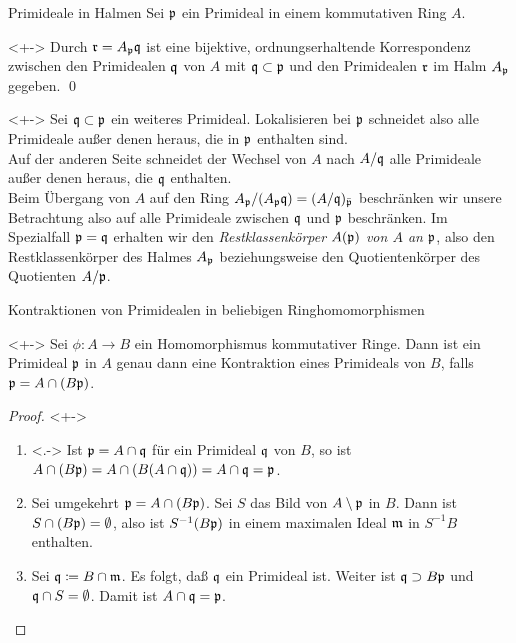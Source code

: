 \begin{frame}{Primideale in Halmen}
	Sei \(\mathfrak{p}\) ein Primideal in einem kommutativen Ring \(A\).
	\begin{corollary}<+->
		Durch \(\mathfrak{r} = A_{\mathfrak{p}} \mathfrak{q}\) ist eine bijektive, ordnungserhaltende Korrespondenz zwischen den
		Primidealen \(\mathfrak{q}\) von \(A\) mit \(\mathfrak{q} \subset \mathfrak{p}\) und den Primidealen \(\mathfrak{r}\) im Halm \(A_{\mathfrak{p}}\)
		gegeben.
		\qed
	\end{corollary}
	\begin{remark}<+->
		Sei \(\mathfrak{q} \subset \mathfrak{p}\) ein weiteres Primideal.
		Lokalisieren bei \(\mathfrak{p}\) schneidet also alle Primideale außer denen heraus, die in \(\mathfrak{p}\) enthalten sind.
		\\
		Auf der anderen Seite schneidet der Wechsel von \(A\) nach \(A/\mathfrak{q}\) alle Primideale außer denen heraus, die
		\(\mathfrak{q}\) enthalten.
		\\
		Beim Übergang von \(A\) auf den Ring \(A_{\mathfrak{p}}/(A_{\mathfrak{p}} \mathfrak{q}) = (A/\mathfrak{q})_{\bar{\mathfrak{p}}}\)
		beschränken wir unsere Betrachtung also auf alle Primideale zwischen \(\mathfrak{q}\) und \(\mathfrak{p}\) beschränken.
		Im Spezialfall \(\mathfrak{p} = \mathfrak{q}\) erhalten wir den \emph{Restklassenkörper \(A(\mathfrak{p})\) von \(A\) an \(\mathfrak{p}\)},
		also den Restklassenkörper des Halmes \(A_{\mathfrak{p}}\) beziehungsweise den Quotientenkörper des Quotienten \(A/\mathfrak{p}\).
	\end{remark}
\end{frame}

\begin{frame}{Kontraktionen von Primidealen in beliebigen Ringhomomorphismen}
	\begin{proposition}<+->
		Sei \(\phi\colon A \to B\) ein Homomorphismus kommutativer Ringe. Dann ist ein Primideal \(\mathfrak{p}\) in
		\(A\) genau dann eine Kontraktion eines Primideals von \(B\), falls \(\mathfrak{p} = A \cap (B\mathfrak{p})\).
	\end{proposition}
	\begin{proof}<+->
		\begin{enumerate}[<+->]
		\item<.->
			Ist \(\mathfrak{p} = A \cap \mathfrak{q}\) für ein Primideal \(\mathfrak{q}\) von \(B\), so ist \(A \cap (B \mathfrak{p})
			= A \cap (B (A \cap \mathfrak{q})) = A \cap \mathfrak{q} = \mathfrak{p}\).
		\item
			Sei umgekehrt \(\mathfrak{p} = A \cap (B \mathfrak{p})\).
			Sei \(S\) das Bild von \(A \setminus \mathfrak{p}\) in \(B\).
			Dann ist \(S \cap (B \mathfrak{p}) = \emptyset\), also ist \(S^{-1} (B \mathfrak{p})\) in einem maximalen
			Ideal \(\mathfrak{m}\) in \(S^{-1} B\) enthalten.
		\item
			Sei \(\mathfrak{q} \coloneqq B \cap \mathfrak{m}\). Es folgt, daß \(\mathfrak{q}\) ein Primideal ist. Weiter ist
			\(\mathfrak{q} \supset B \mathfrak{p}\) und \(\mathfrak{q} \cap S = \emptyset\). Damit ist \(A \cap \mathfrak{q} = \mathfrak{p}\).
			\qedhere
		\end{enumerate}
	\end{proof}
\end{frame}

